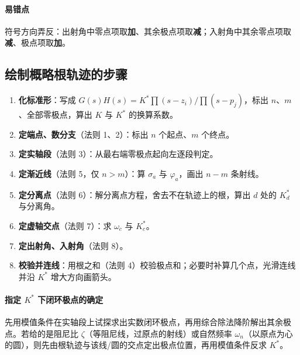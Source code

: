 \paragraph{易错点}符号方向弄反：出射角中零点项取\textbf{加}、其余极点项取\textbf{减}；入射角中其余零点项取\textbf{减}、极点项取\textbf{加}。

\subsection{绘制概略根轨迹的步骤}
\begin{enumerate}
    \item \textbf{化标准形}：写成 $G(s)H(s)=K^*\prod(s-z_i)/\prod(s-p_j)$，标出 $n$、$m$、全部零极点，算出 $K$ 与 $K^*$ 的换算系数。
    \item \textbf{定端点、数分支}（法则 1、2）：标出 $n$ 个起点、$m$ 个终点。
    \item \textbf{定实轴段}（法则 3）：从最右端零极点起向左逐段判定。
    \item \textbf{定渐近线}（法则 5，仅 $n>m$）：算 $\sigma_a$ 与 $\varphi_a$，画出 $n-m$ 条射线。
    \item \textbf{定分离点}（法则 6）：解分离点方程，舍去不在轨迹上的根，算出 $d$ 处的 $K^*_d$ 与分离角。
    \item \textbf{定虚轴交点}（法则 7）：求 $\omega_c$ 与 $K^*_c$。
    \item \textbf{定出射角、入射角}（法则 8）。
    \item \textbf{校验并连线}：用根之和（法则 4）校验极点和；必要时补算几个点，光滑连线并沿 $K^*$ 增大方向画箭头。
\end{enumerate}

\paragraph{指定 $K^*$ 下闭环极点的确定}先用模值条件在实轴段上试探求出实数闭环极点，再用综合除法降阶解出其余极点。若给的是阻尼比 $\zeta$（等阻尼线，过原点的射线）或自然频率 $\omega_n$（以原点为心的圆），则先由根轨迹与该线/圆的交点定出极点位置，再用模值条件反求 $K^*$。

